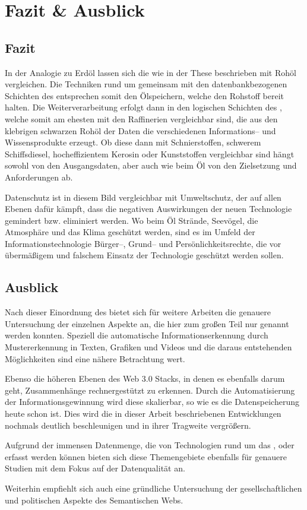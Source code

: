 \section{Fazit \& Ausblick}

\subsection{Fazit}

In der Analogie zu Erdöl lassen sich die  wie in der These beschrieben mit Rohöl vergleichen. Die Techniken rund um  gemeinsam mit den datenbankbezogenen Schichten des  entsprechen somit den Ölspeichern, welche den Rohstoff bereit halten. Die Weiterverarbeitung erfolgt dann in den logischen Schichten des , welche somit am ehesten mit den Raffinerien vergleichbar sind, die aus den klebrigen schwarzen Rohöl der Daten die verschiedenen Informations-- und Wissensprodukte erzeugt. Ob diese dann mit Schnierstoffen, schwerem Schiffsdiesel, hocheffizientem Kerosin oder Kunststoffen vergleichbar sind hängt sowohl von den Ausgangsdaten, aber auch wie beim Öl von den Zielsetzung und Anforderungen ab.

Datenschutz ist in diesem Bild vergleichbar mit Umweltschutz, der auf allen Ebenen dafür kämpft, dass die negativen Auswirkungen der neuen Technologie gemindert bzw. eliminiert werden. Wo beim Öl Strände, Seevögel, die Atmosphäre und das Klima geschützt werden, sind es  im Umfeld der Informationstechnologie Bürger--, Grund-- und Persönlichkeitsrechte, die vor übermäßigem und falschem Einsatz der Technologie geschützt werden sollen.

\subsection{Ausblick}
\label{ausblick}

Nach dieser Einordnung des  bietet sich für weitere Arbeiten die genauere Untersuchung der einzelnen Aspekte an, die hier zum großen Teil nur genannt werden konnten. Speziell die automatische Informationserkennung durch Mustererkennung in Texten, Grafiken und Videos und die daraus entstehenden Möglichkeiten sind eine nähere Betrachtung wert. 

Ebenso die höheren Ebenen des Web 3.0 Stacks, in denen es ebenfalls darum geht, Zusammenhänge rechnergestützt zu erkennen. Durch die Automatisierung der Informationsgewinnung wird diese skalierbar, so wie es die Datenspeicherung heute schon ist. Dies wird die in dieser Arbeit beschriebenen Entwicklungen nochmals deutlich beschleunigen und in ihrer Tragweite vergrößern. 

Aufgrund der immensen Datenmenge, die von Technologien rund um das ,  oder  erfasst werden können bieten sich diese Themengebiete ebenfalls für genauere Studien mit dem Fokus auf der Datenqualität an.

Weiterhin empfiehlt sich auch eine gründliche Untersuchung der gesellschaftlichen und politischen Aspekte des Semantischen Webs.